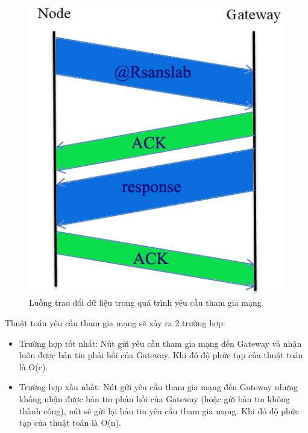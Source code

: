 \begin{figure}[h]
\begin{center}
\includegraphics[scale= 0.5]{image/luong1}
\end{center}
\caption{Luồng trao đổi dữ liệu trong quá trình yêu cầu tham gia mạng}
\label{refluong1}
\end{figure}
\par 
Thuật toán yêu cầu tham gia mạng sẽ xảy ra 2 trường hợp:
\begin{itemize}
\item Trường hợp tốt nhất: Nút gửi yêu cầu tham gia mạng đến Gateway và nhận luôn được bản tin phải hồi của Gateway. Khi đó độ phức tạp của thuật toán là O(c).
\item Trường hợp xấu nhất: Nút gửi yêu cầu tham gia mạng đến Gateway nhưng không nhận được bản tin phản hồi của Gateway (hoặc gửi bản tin không thành công), nút sẽ gửi lại bản tin yêu cầu tham gia mạng. Khi đó độ phức tạp của thuật toán là O(n).
\end{itemize}
